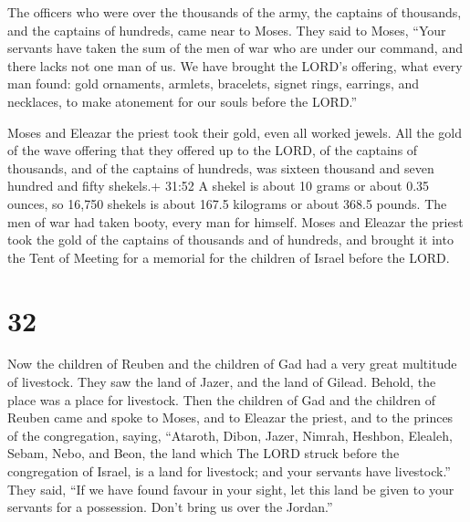  The officers who were over the thousands of the army, the
captains of thousands, and the captains of hundreds, came near to Moses.
 They said to Moses, ``Your servants have taken the sum of
the men of war who are under our command, and there lacks not one man of
us.  We have brought the LORD's offering, what every man
found: gold ornaments, armlets, bracelets, signet rings, earrings, and
necklaces, to make atonement for our souls before the LORD.''

 Moses and Eleazar the priest took their gold, even all
worked jewels.  All the gold of the wave offering that they
offered up to the LORD, of the captains of thousands, and of the
captains of hundreds, was sixteen thousand and seven hundred and fifty
shekels.+ 31:52 A shekel is about 10 grams or about 0.35 ounces, so
16,750 shekels is about 167.5 kilograms or about 368.5 pounds.
 The men of war had taken booty, every man for himself.
 Moses and Eleazar the priest took the gold of the captains
of thousands and of hundreds, and brought it into the Tent of Meeting
for a memorial for the children of Israel before the LORD.

\hypertarget{section-31}{%
\section{32}\label{section-31}}

 Now the children of Reuben and the children of Gad had a
very great multitude of livestock. They saw the land of Jazer, and the
land of Gilead. Behold, the place was a place for livestock.
 Then the children of Gad and the children of Reuben came
and spoke to Moses, and to Eleazar the priest, and to the princes of the
congregation, saying,  ``Ataroth, Dibon, Jazer, Nimrah,
Heshbon, Elealeh, Sebam, Nebo, and Beon,  the land which The
LORD struck before the congregation of Israel, is a land for livestock;
and your servants have livestock.''  They said, ``If we have
found favour in your sight, let this land be given to your servants for
a possession. Don't bring us over the Jordan.''

